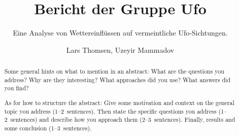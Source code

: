 \title{Bericht der Gruppe \glqq Ufo\glqq}
\subtitle{Eine Analyse von Wettereinflüssen auf vermeintliche Ufo-Sichtungen.}         %


\author{Lars Thomsen, Uzeyir Mammadov}

\begin{abstract}
 Some general hints on what to mention in an abstract: What are the questions you address? Why are they interesting? What approaches did you use? What answers did you find?
 
 As for how to structure the abstract: Give some motivation and context on the general topic you address (1--2~sentences). Then state the specific questions you address (1--2~sentences) and describe how you approach them (2--3~sentences). Finally, results and some conclusion (1--3~sentences).
\end{abstract}

\maketitle

